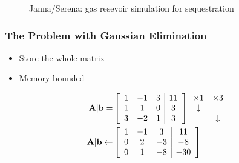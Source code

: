 \documentclass[t,12pt,numbers,fleqn]{beamer}
\begin{document}
\begin{frame}
\begin{figure}[hh]
\begin{subfigure}[b]{0.37\textwidth}
  \end{subfigure}
  \caption*{Janna/Serena: gas resevoir simulation for 
    sequestration}
  \label{fig:Serena}
\end{figure}

\end{frame}


\begin{frame}
\frametitle{The Problem with Gaussian Elimination}

\begin{itemize}
\item Store the whole matrix
\item Memory bounded
\end{itemize}

\[
  \begin{aligned}
    \mathbf{A}|\mathbf{b} = &
    \left[
      \begin{array}{ccc|c}
        1 & -1 & 3 & 11 \\
        1 &  1 & 0 &  3 \\
        3 & -2 & 1 &  3
      \end{array}
    \right]
    \begin{array}{cc}
      \times 1 & \times 3 \\
      \downarrow   & \\
               & \downarrow
    \end{array}
    \\
    \mathbf{A}|\mathbf{b} \leftarrow &
    \left[
    \begin{array}{ccc|c}
      1 & -1 & 3 &  11 \\
      0 &  2 & -3 &  -8 \\
      0 &  1 & -8 & -30
    \end{array}
    \right]
  \end{aligned}
\]

\end{frame}

\end{document}
